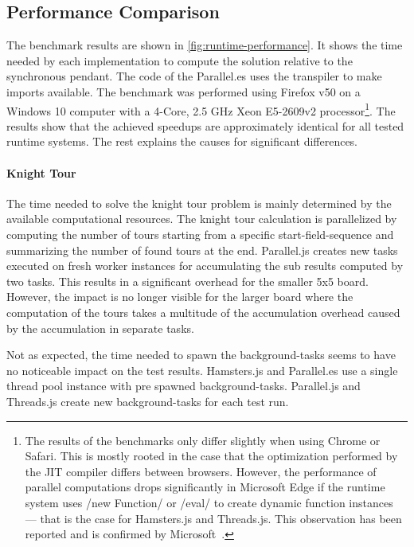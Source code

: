 \subsection{Performance Comparison}
The benchmark results are shown in \cref{fig:runtime-performance}. It shows the time needed by each implementation to compute the solution relative to the synchronous pendant. The code of the Parallel.es uses the transpiler to make imports available. The benchmark was performed using Firefox v50 on a Windows 10 computer with a 4-Core, 2.5 GHz Xeon E5-2609v2 processor\footnote{The results of the benchmarks only differ slightly when using Chrome or Safari. This is mostly rooted in the case that the optimization performed by the JIT compiler differs between browsers. However, the performance of parallel computations drops significantly in Microsoft Edge if the runtime system uses \javascriptinline/new Function/ or \javascriptinline/eval/ to create dynamic function instances --- that is the case for Hamsters.js and Threads.js. This observation has been reported and is confirmed by Microsoft~\cite{newFunctionWebWorkerEdge}.}. The results show that the achieved speedups are approximately identical for all tested runtime systems. The rest explains the causes for significant differences.

\begin{figure*}
		
	\caption{Runtime Performance of Parallelization Problems Relative to Synchronously Execution}
	\label{fig:runtime-performance}
\end{figure*}


\paragraph{Knight Tour} The time needed to solve the knight tour problem is mainly determined by the available computational resources. The knight tour calculation is parallelized by computing the number of tours starting from a specific start-field-sequence and summarizing the  number of found tours at the end. Parallel.js creates new tasks executed on fresh worker instances for accumulating the sub results computed by two tasks. This results in a significant overhead for the smaller 5x5 board. However, the impact is no longer visible for the larger board where the computation of the tours takes a multitude of the accumulation overhead caused by the accumulation in separate tasks.

Not as expected, the time needed to spawn the background-tasks seems to have no noticeable impact on the test results. Hamsters.js and Parallel.es use a single thread pool instance with pre spawned background-tasks. Parallel.js and Threads.js create new background-tasks for each test run.

